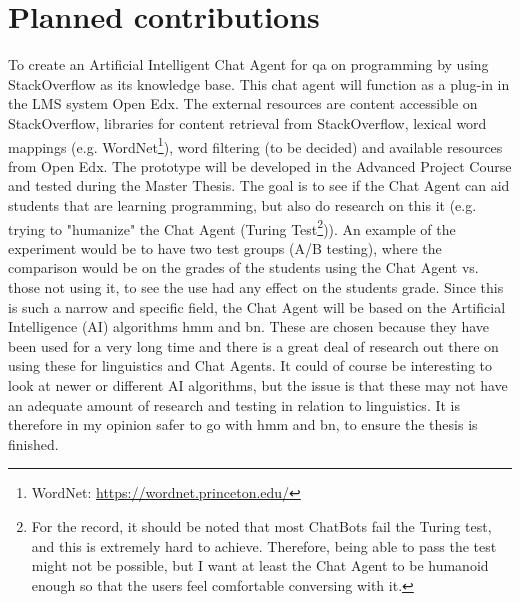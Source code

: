 \section{Planned contributions}
\label{chapter2:planned_contribution}
To create an Artificial Intelligent Chat Agent for \gls{qa} on programming by using StackOverflow as its knowledge base. This chat agent will function as a plug-in in the LMS system Open Edx. The external resources are content accessible on StackOverflow, libraries for content retrieval from StackOverflow, lexical word mappings (e.g. WordNet\footnote{WordNet: \url{https://wordnet.princeton.edu/}}), word filtering (to be decided) and available resources from Open Edx.
\vspace{0.5em}\newline
The prototype will be developed in the Advanced Project Course and tested during the Master Thesis. The goal is to see if the Chat Agent can aid students that are learning programming, but also do research on this it (e.g. trying to "humanize" the Chat Agent (Turing Test\footnote{For the record, it should be noted that most ChatBots fail the Turing test, and this is extremely hard to achieve. Therefore, being able to pass the test might not be possible, but I want at least the Chat Agent to be humanoid enough so that the users feel comfortable conversing with it.})). An example of the experiment would be to have two test groups (A/B testing), where the comparison would be on the grades of the students using the Chat Agent vs. those not using it, to see the use had any effect on the students grade.
\vspace{0.5em}\newline
Since this is such a narrow and specific field, the Chat Agent will be based on the Artificial Intelligence (AI) algorithms  \gls{hmm} and 
 \gls{bn}. These are chosen because they have been used for a very long time and there is a great deal of research out there on using these for linguistics and Chat Agents. It could of course be interesting to look at newer or different AI algorithms, but the issue is that these may not have an adequate amount of research and testing in relation to linguistics. It is therefore in my opinion safer to go with \gls{hmm} and  \gls{bn}, to ensure the thesis is finished.